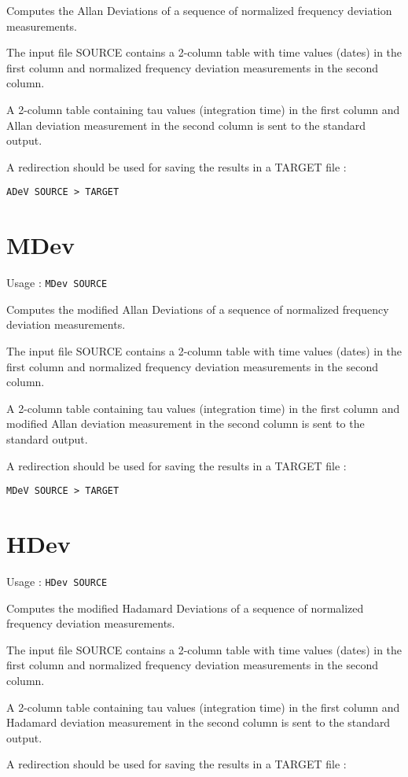 \documentclass[12pt,a4paper,french]{article}
\begin{document}
Computes the Allan Deviations of a sequence of normalized frequency deviation measurements.

The input file SOURCE contains a 2-column table with time values (dates) in the first column and normalized frequency deviation measurements in the second column.

A 2-column table containing tau values (integration time) in the first column and Allan deviation measurement in the second column is sent to the standard output.

A redirection should be used for saving the results in a TARGET file : 

{\tt{ADeV SOURCE > TARGET}}

\section{MDev}

Usage : {\tt{MDev SOURCE}}

Computes the modified Allan Deviations of a sequence of normalized frequency deviation measurements.

The input file SOURCE contains a 2-column table with time values (dates) in the first column and normalized frequency deviation measurements in the second column.

A 2-column table containing tau values (integration time) in the first column and modified Allan deviation measurement in the second column is sent to the standard output.

A redirection should be used for saving the results in a TARGET file : 

{\tt{MDeV SOURCE > TARGET}}

\section{ HDev}

Usage : {\tt{HDev SOURCE}}

Computes the modified Hadamard Deviations of a sequence of normalized frequency deviation measurements.

The input file SOURCE contains a 2-column table with time values (dates) in the first column and normalized frequency deviation measurements in the second column.

A 2-column table containing tau values (integration time) in the first column and Hadamard deviation measurement in the second column is sent to the standard output.

A redirection should be used for saving the results in a TARGET file : 
\end{document}

